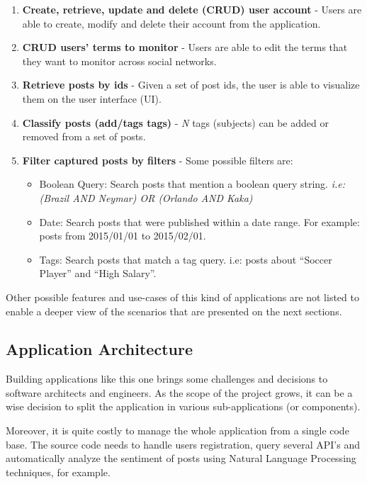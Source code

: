 \begin{enumerate}
\item{\textbf{Create, retrieve, update and delete (CRUD) user account} - Users are able to create, modify and delete their account from the application.}

\item{\textbf{CRUD users' terms to monitor} - Users are able to edit the terms that they want to monitor across social networks.}

\item{\textbf{Retrieve posts by ids} - Given a set of post ids, the user is able to visualize them on the user interface (UI).}

\item{\textbf{Classify posts (add/tags tags)} - \textit{N} tags (subjects) can be added or removed from a set of posts.}

\item{\textbf{Filter captured posts by filters} - Some possible filters are: 
\begin{itemize}
\item{Boolean Query:} Search posts that mention a boolean query string. \textit{i.e: (Brazil AND Neymar) OR (Orlando AND Kaka)}
\item{Date:} Search posts that were published within a date range. For example: posts from 2015/01/01 to 2015/02/01.
\item{Tags:} Search posts that match a tag query. i.e: posts about ``Soccer Player'' and ``High Salary''.
\end{itemize}
}

\end{enumerate}

Other possible features and use-cases of this kind of applications are not listed to enable a deeper view of the scenarios that are presented on the next sections.

\subsection{Application Architecture}
Building applications like this one brings some challenges and decisions to software architects and engineers. As the scope of the project grows, it can be a wise decision to split the application in various sub-applications (or components).

Moreover, it is quite costly to manage the whole application from a single code base. The source code needs to handle users registration, query several API's and automatically analyze the sentiment of posts using Natural Language Processing techniques, for example. 

